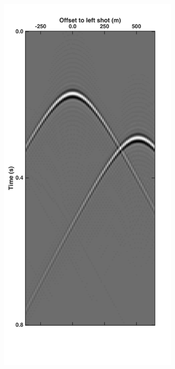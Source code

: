 \begin{figure}
	\centering
	\begin{subfigure}[t]{0.25\textwidth}
		\includegraphics[width=\textwidth]{Plots/Mahdad/30iter/Pseudo-DeblendedCSG_sh1}	

\end{subfigure}
\end{figure}
